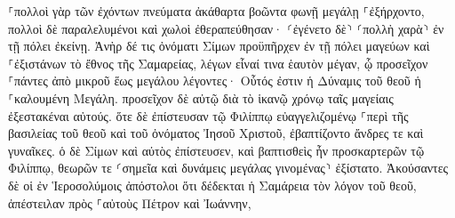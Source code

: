 \documentclass{openreader}
\begin{document}
⸀πολλοὶ γὰρ τῶν ἐχόντων πνεύματα ἀκάθαρτα βοῶντα φωνῇ μεγάλῃ ⸀ἐξήρχοντο, πολλοὶ δὲ παραλελυμένοι καὶ χωλοὶ ἐθεραπεύθησαν· 
⸂ἐγένετο δὲ⸃ ⸂πολλὴ χαρὰ⸃ ἐν τῇ πόλει ἐκείνῃ. 
Ἀνὴρ δέ τις ὀνόματι Σίμων προϋπῆρχεν ἐν τῇ πόλει μαγεύων καὶ ⸀ἐξιστάνων τὸ ἔθνος τῆς Σαμαρείας, λέγων εἶναί τινα ἑαυτὸν μέγαν, 
ᾧ προσεῖχον ⸀πάντες ἀπὸ μικροῦ ἕως μεγάλου λέγοντες· Οὗτός ἐστιν ἡ Δύναμις τοῦ θεοῦ ἡ ⸀καλουμένη Μεγάλη. 
προσεῖχον δὲ αὐτῷ διὰ τὸ ἱκανῷ χρόνῳ ταῖς μαγείαις ἐξεστακέναι αὐτούς. 
ὅτε δὲ ἐπίστευσαν τῷ Φιλίππῳ εὐαγγελιζομένῳ ⸀περὶ τῆς βασιλείας τοῦ θεοῦ καὶ τοῦ ὀνόματος Ἰησοῦ Χριστοῦ, ἐβαπτίζοντο ἄνδρες τε καὶ γυναῖκες. 
ὁ δὲ Σίμων καὶ αὐτὸς ἐπίστευσεν, καὶ βαπτισθεὶς ἦν προσκαρτερῶν τῷ Φιλίππῳ, θεωρῶν τε ⸂σημεῖα καὶ δυνάμεις μεγάλας γινομένας⸃ ἐξίστατο. 
Ἀκούσαντες δὲ οἱ ἐν Ἱεροσολύμοις ἀπόστολοι ὅτι δέδεκται ἡ Σαμάρεια τὸν λόγον τοῦ θεοῦ, ἀπέστειλαν πρὸς ⸀αὐτοὺς Πέτρον καὶ Ἰωάννην, 
\end{document}
